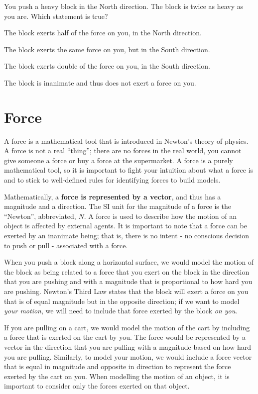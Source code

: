 \begin{checkpoint}
\begin{MCquestion}{You push a heavy block in the North direction. The block is twice as heavy as you are. Which statement is true?}
\item The block exerts half of the force on you, in the North direction.
\item The block exerts the same force on you, but in the South direction. \correct
\item The block exerts double of the force on you, in the South direction.
\item The block is inanimate and thus does not exert a force on you. 
\end{MCquestion}
\end{checkpoint}

\section{Force}
A force is a mathematical tool that is introduced in Newton's theory of physics. A force is not a real ``thing''; there are no forces in the real world, you cannot give someone a force or buy a force at the supermarket. A force is a purely mathematical tool, so it is important to fight your intuition about what a force is and to stick to well-defined rules for identifying forces to build models.

Mathematically, a \textbf{force is represented by a vector}, and thus has a magnitude and a direction. The SI unit for the magnitude of a force is the ``Newton'', abbreviated, $\si{N}$. A force is used to describe how the motion of an object is affected by external agents. It is important to note that a force can be exerted by an inanimate being; that is, there is no intent - no conscious decision to push or pull - associated with a force.

When you push a block along a horizontal surface, we would model the motion of the block as being related to a force that you exert on the block in the direction that you are pushing and with a magnitude that is proportional to how hard you are pushing. Newton's Third Law states that the block will exert a force on you that is of equal magnitude but in the opposite direction; if we want to model \textit{your motion}, we will need to include that force exerted by the block \textit{on you}. 

If you are pulling on a cart, we would model the motion of the cart by including a force that is exerted on the cart by you. The force would be represented by a vector in the direction that you are pulling with a magnitude based on how hard you are pulling. Similarly, to model your motion, we would include a force vector that is equal in magnitude and opposite in direction to represent the force exerted by the cart on you. When modelling the motion of an object, it is important to consider only the forces exerted on that object.

